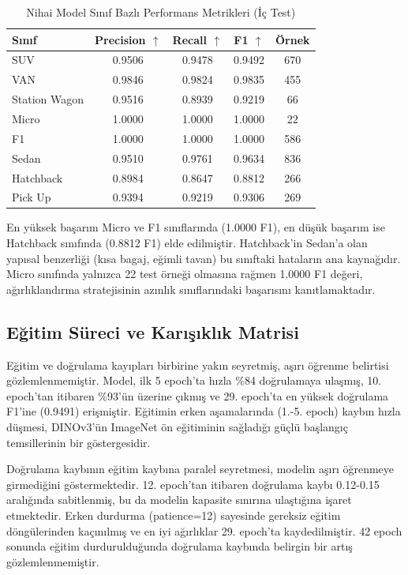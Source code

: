 \documentclass[conference]{IEEEtran}
\begin{document}
\begin{table}[h]
\centering
\caption{Nihai Model Sınıf Bazlı Performans Metrikleri (İç Test)}
\label{tab:class_metrics}
\begin{tabular}{@{}lcccc@{}}
\toprule
\textbf{Sınıf} & \textbf{Precision $\uparrow$} & \textbf{Recall $\uparrow$} & \textbf{F1 $\uparrow$} & \textbf{Örnek} \\ \midrule
SUV      & 0.9506 & 0.9478 & 0.9492 & 670 \\
VAN      & 0.9846 & 0.9824 & 0.9835 & 455 \\
Station Wagon & 0.9516 & 0.8939 & 0.9219 & 66  \\
Micro    & 1.0000 & 1.0000 & 1.0000 & 22  \\
F1       & 1.0000 & 1.0000 & 1.0000 & 586 \\
Sedan    & 0.9510 & 0.9761 & 0.9634 & 836 \\
Hatchback& 0.8984 & 0.8647 & 0.8812 & 266 \\
Pick Up  & 0.9394 & 0.9219 & 0.9306 & 269 \\ \bottomrule
\end{tabular}
\end{table}

En yüksek başarım Micro ve F1 sınıflarında (1.0000 F1), en düşük başarım ise Hatchback sınıfında (0.8812 F1) elde edilmiştir. Hatchback'in Sedan'a olan yapısal benzerliği (kısa bagaj, eğimli tavan) bu sınıftaki hataların ana kaynağıdır. Micro sınıfında yalnızca 22 test örneği olmasına rağmen 1.0000 F1 değeri, ağırlıklandırma stratejisinin azınlık sınıflarındaki başarısını kanıtlamaktadır.

\subsection{Eğitim Süreci ve Karışıklık Matrisi}
Eğitim ve doğrulama kayıpları birbirine yakın seyretmiş, aşırı öğrenme belirtisi gözlemlenmemiştir. Model, ilk 5 epoch'ta hızla \%84 doğrulamaya ulaşmış, 10. epoch'tan itibaren \%93'ün üzerine çıkmış ve 29. epoch'ta en yüksek doğrulama F1'ine (0.9491) erişmiştir. Eğitimin erken aşamalarında (1.-5. epoch) kaybın hızla düşmesi, DINOv3'ün ImageNet ön eğitiminin sağladığı güçlü başlangıç temsillerinin bir göstergesidir.

Doğrulama kaybının eğitim kaybına paralel seyretmesi, modelin aşırı öğrenmeye girmediğini göstermektedir. 12. epoch'tan itibaren doğrulama kaybı 0.12-0.15 aralığında sabitlenmiş, bu da modelin kapasite sınırına ulaştığına işaret etmektedir. Erken durdurma (patience=12) sayesinde gereksiz eğitim döngülerinden kaçınılmış ve en iyi ağırlıklar 29. epoch'ta kaydedilmiştir. 42 epoch sonunda eğitim durdurulduğunda doğrulama kaybında belirgin bir artış gözlemlenmemiştir.
\end{document}
